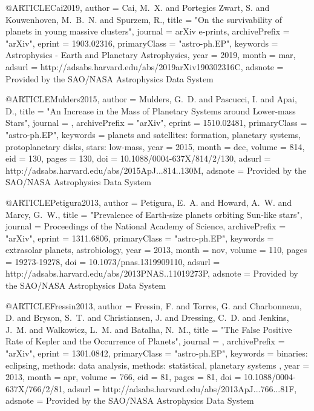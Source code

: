 \documentclass[twocolumn,tighten]{aastex63}
\begin{document}
{@ARTICLE{Cai2019,
   author = {{Cai}, M.~X. and {Portegies Zwart}, S. and {Kouwenhoven}, M.~B.~N. and 
	{Spurzem}, R.},
    title = "{On the survivability of planets in young massive clusters}",
  journal = {arXiv e-prints},
archivePrefix = "arXiv",
   eprint = {1903.02316},
 primaryClass = "astro-ph.EP",
 keywords = {Astrophysics - Earth and Planetary Astrophysics},
     year = 2019,
    month = mar,
   adsurl = {http://adsabs.harvard.edu/abs/2019arXiv190302316C},
  adsnote = {Provided by the SAO/NASA Astrophysics Data System}
}

@ARTICLE{Mulders2015,
   author = {{Mulders}, G.~D. and {Pascucci}, I. and {Apai}, D.},
    title = "{An Increase in the Mass of Planetary Systems around Lower-mass Stars}",
  journal = {\apj},
archivePrefix = "arXiv",
   eprint = {1510.02481},
 primaryClass = "astro-ph.EP",
 keywords = {planets and satellites: formation, planetary systems, protoplanetary disks, stars: low-mass},
     year = 2015,
    month = dec,
   volume = 814,
      eid = {130},
    pages = {130},
      doi = {10.1088/0004-637X/814/2/130},
   adsurl = {http://adsabs.harvard.edu/abs/2015ApJ...814..130M},
  adsnote = {Provided by the SAO/NASA Astrophysics Data System}
}

@ARTICLE{Petigura2013,
   author = {{Petigura}, E.~A. and {Howard}, A.~W. and {Marcy}, G.~W.},
    title = "{Prevalence of Earth-size planets orbiting Sun-like stars}",
  journal = {Proceedings of the National Academy of Science},
archivePrefix = "arXiv",
   eprint = {1311.6806},
 primaryClass = "astro-ph.EP",
 keywords = {extrasolar planets, astrobiology},
     year = 2013,
    month = nov,
   volume = 110,
    pages = {19273-19278},
      doi = {10.1073/pnas.1319909110},
   adsurl = {http://adsabs.harvard.edu/abs/2013PNAS..11019273P},
  adsnote = {Provided by the SAO/NASA Astrophysics Data System}
}

@ARTICLE{Fressin2013,
   author = {{Fressin}, F. and {Torres}, G. and {Charbonneau}, D. and {Bryson}, S.~T. and 
	{Christiansen}, J. and {Dressing}, C.~D. and {Jenkins}, J.~M. and 
	{Walkowicz}, L.~M. and {Batalha}, N.~M.},
    title = "{The False Positive Rate of Kepler and the Occurrence of Planets}",
  journal = {\apj},
archivePrefix = "arXiv",
   eprint = {1301.0842},
 primaryClass = "astro-ph.EP",
 keywords = {binaries: eclipsing, methods: data analysis, methods: statistical, planetary systems },
     year = 2013,
    month = apr,
   volume = 766,
      eid = {81},
    pages = {81},
      doi = {10.1088/0004-637X/766/2/81},
   adsurl = {http://adsabs.harvard.edu/abs/2013ApJ...766...81F},
  adsnote = {Provided by the SAO/NASA Astrophysics Data System}
}

}
\end{document}
